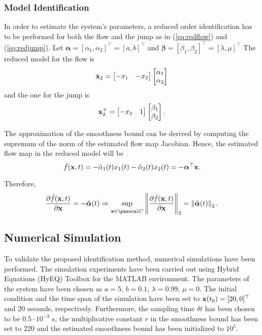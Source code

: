 \subsubsection{Model Identification}
In order to estimate the system's parameters, a reduced order identification has to be performed for both the flow and the jump as in (\ref{eq:redflow}) and (\ref{eq:redjump}). Let $\bm{\alpha} = \left[{\alpha}_1,{\alpha}_2\right]^\top=\left[a,b\right]^\top$ and $\bm{\beta} = \left[{\beta}_1,{\beta}_2\right]^\top = [\lambda,\mu]^\top$
The reduced model for the flow is
%
\begin{equation}
    \dot{\mathbf{x}}_2 = \begin{bmatrix}-x_1&-x_2\end{bmatrix}\begin{bmatrix}{\alpha}_1\\{\alpha}_2\end{bmatrix}
\end{equation}
%
and the one for the jump is
%
\begin{equation}
    \mathbf{x}_2^+ = \begin{bmatrix}-x_2&1\end{bmatrix}\begin{bmatrix}{\beta}_1\\{\beta}_2\end{bmatrix}.
\end{equation}
%

The approximation of the  smoothness bound can be derived by computing the supremum of the norm of the estimated flow map Jacobian. Hence, the estimated flow map in the reduced model will be
%
\begin{equation}
    \hat{{f}}(\mathbf{x},t)=-\hat{{\alpha}}_1(t)x_1(t)-\hat{{\alpha}}_2(t)x_2(t) = -\bm{\alpha}^\top\mathbf{x}.
\end{equation}
%

Therefore,
\begin{align}
	\frac{\partial \hat{{f}}(\x,t)}{\partial \x} = -\hat{\bm{\alpha}}(t)
	\Rightarrow\sup\limits_{\x\in\hat{\C}}\left\|\frac{\partial \hat{{f}}(\x,t)}{\partial\x}\right\|_2 = \left\|\hat{\bm{\alpha}}(t)\right\|_2.
\end{align}
%
\subsection{Numerical Simulation}
To validate the proposed identification method, numerical simulations have been performed. The simulation experiments have been carried out using Hybrid Equations (HyEQ) Toolbox \cite{sanfelice2013toolbox} for the MATLAB environment. The parameters of the system have been chosen as $a = 5$, $b = 0.1$, $\lambda=0.99$, $\mu=0$. 
%
The initial condition and the time span of the simulation have been set to $\mathbf{x}(t_0)=[20,0]^\top$ and $20$ seconds, respectively. Furthermore, the sampling time $\delta t$ has been chosen to be $0.5\cdot 10^{-3}$ s, the multiplicative constant $r$ in the smoothness bound has been set to 220 and the estimated smoothness bound has been initialized to $10^5$.


